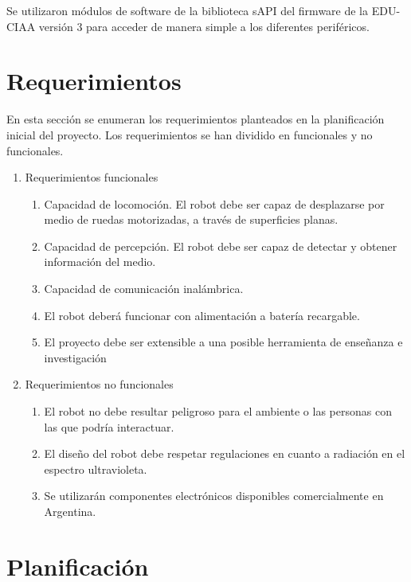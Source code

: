 Se utilizaron módulos de software de la biblioteca sAPI \citep{sapi} del firmware de la EDU-CIAA versión 3 para acceder de manera simple a los diferentes periféricos.



\section{Requerimientos}

En esta sección se enumeran los requerimientos planteados en la planificación inicial del proyecto.  Los  requerimientos se han dividido en funcionales y no funcionales.

\label{sec:requerimientos}

\begin{enumerate}
\item Requerimientos funcionales
	\begin{enumerate}
	\item Capacidad de locomoción.  El robot debe ser capaz de desplazarse por medio de ruedas motorizadas, a través de superficies planas.
	\item Capacidad de percepción. El robot debe ser capaz de detectar y obtener información del medio. 
	\item Capacidad de comunicación inalámbrica.
	\item El robot deberá funcionar con alimentación a batería recargable.
	\item El proyecto debe ser extensible a una posible herramienta de enseñanza e investigación

	\end{enumerate}
\item Requerimientos no funcionales
	\begin{enumerate}
	\item El robot no debe resultar peligroso para el ambiente o las personas con las que podría interactuar.
	\item El diseño del robot debe respetar regulaciones en cuanto a radiación en el espectro ultravioleta.
	\item Se utilizarán componentes electrónicos disponibles comercialmente en Argentina.
	\end{enumerate}
\end{enumerate}

\section{Planificación}

